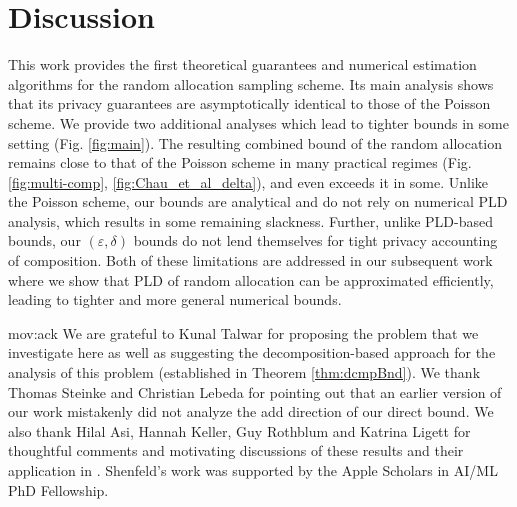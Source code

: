 \documentclass{article}
\newif\ifconferencemode
\newcommand{\showstored}[1]{\csname stored#1\endcsname}
\newif\ifconferencemode
\newcommand{\Arxiv}[1]{}
\newcommand{\Arxiv}[1]{#1}
\theoremstyle{plain}
\theoremstyle{definition}
\newcommand{\eps}{\varepsilon}
\begin{document}
\section{Discussion}
This work provides the first theoretical guarantees and numerical estimation algorithms for the random allocation sampling scheme. Its main analysis shows that its privacy guarantees are asymptotically identical to those of the Poisson scheme. We provide two additional analyses which lead to tighter bounds in some setting (Fig. \ref{fig:main}). The resulting combined bound of the random allocation remains close to that of the Poisson scheme in many practical regimes (Fig. \ref{fig:multi-comp}, \ref{fig:Chau_et_al_delta}), and even exceeds it in some. Unlike the Poisson scheme, our bounds are analytical and do not rely on numerical PLD analysis, which results in some remaining slackness. Further, unlike PLD-based bounds, our $(\eps,\delta)$ bounds do not lend themselves for tight privacy accounting of composition. Both of these limitations are addressed in our subsequent work \citep{FS25b} where we show that PLD of random allocation can be approximated efficiently, leading to tighter and more general numerical bounds. 

\Arxiv{\subsection*{Acknowledgments}}
\begin{movable}{mov:ack}{}
We are grateful to Kunal Talwar for proposing the problem that we investigate here as well as suggesting the decomposition-based approach for the analysis of this problem (established in Theorem \ref{thm:dcmpBnd}).  We thank Thomas Steinke and Christian Lebeda for pointing out that an  earlier version of our work mistakenly did not analyze the add direction of our direct bound. We also thank Hilal Asi, Hannah Keller, Guy Rothblum and Katrina Ligett for thoughtful comments and motivating discussions of these results and their application in \citep{AFKRT25}. 
Shenfeld’s work was supported by the Apple Scholars in AI/ML PhD Fellowship.
\end{movable}

\ifconferencemode
\newpage
\begin{ack}
\showstored{mov:ack}
\end{ack}
\else
\newpage
\fi




\newpage
\appendix
\ifconferencemode
\end{document}

